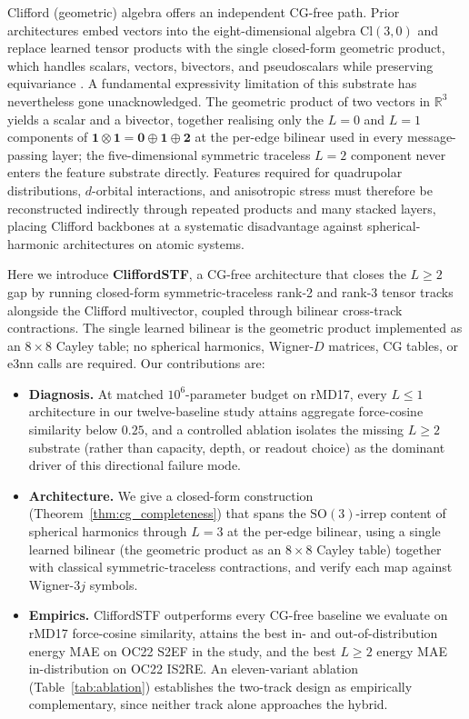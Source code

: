 Clifford (geometric) algebra offers an independent CG-free path. Prior architectures embed vectors into the eight-dimensional algebra $\mathrm{Cl}(3,0)$ and replace learned tensor products with the single closed-form geometric product, which handles scalars, vectors, bivectors, and pseudoscalars while preserving equivariance \citep{ruhe2023cgenn,ruhe2023gcan,brehmer2023geometric,brandstetter2022clifford}. A fundamental expressivity limitation of this substrate has nevertheless gone unacknowledged. The geometric product of two vectors in $\mathbb{R}^3$ yields a scalar and a bivector, together realising only the $L{=}0$ and $L{=}1$ components of $\mathbf{1} \otimes \mathbf{1} = \mathbf{0} \oplus \mathbf{1} \oplus \mathbf{2}$ at the per-edge bilinear used in every message-passing layer; the five-dimensional symmetric traceless $L{=}2$ component never enters the feature substrate directly. Features required for quadrupolar distributions, $d$-orbital interactions, and anisotropic stress must therefore be reconstructed indirectly through repeated products and many stacked layers, placing Clifford backbones at a systematic disadvantage against spherical-harmonic architectures on atomic systems.

Here we introduce \textbf{CliffordSTF}, a CG-free architecture that closes the $L{\geq}2$ gap by running closed-form symmetric-traceless rank-2 and rank-3 tensor tracks alongside the Clifford multivector, coupled through bilinear cross-track contractions. The single learned bilinear is the geometric product implemented as an $8\times 8$ Cayley table; no spherical harmonics, Wigner-$D$ matrices, CG tables, or e3nn calls are required. Our contributions are:

\begin{itemize}
    \item \textbf{Diagnosis.} At matched $10^6$-parameter budget on rMD17, every $L\leq 1$ architecture in our twelve-baseline study attains aggregate force-cosine similarity below $0.25$, and a controlled ablation isolates the missing $L\geq 2$ substrate (rather than capacity, depth, or readout choice) as the dominant driver of this directional failure mode.
    \item \textbf{Architecture.} We give a closed-form construction (Theorem~\ref{thm:cg_completeness}) that spans the $\mathrm{SO}(3)$-irrep content of spherical harmonics through $L{=}3$ at the per-edge bilinear, using a single learned bilinear (the geometric product as an $8\times 8$ Cayley table) together with classical symmetric-traceless contractions, and verify each map against Wigner-$3j$ symbols.
    \item \textbf{Empirics.} CliffordSTF outperforms every CG-free baseline we evaluate on rMD17 force-cosine similarity, attains the best in- and out-of-distribution energy MAE on OC22 S2EF in the study, and the best $L\!\geq\!2$ energy MAE in-distribution on OC22 IS2RE. An eleven-variant ablation (Table~\ref{tab:ablation}) establishes the two-track design as empirically complementary, since neither track alone approaches the hybrid.
\end{itemize}